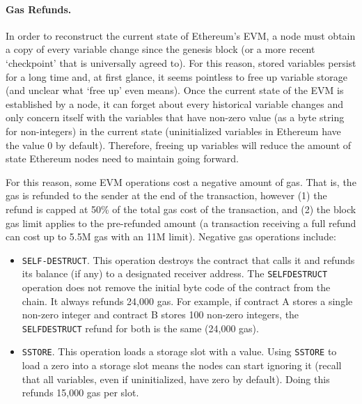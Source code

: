

\paragraph{Gas Refunds.} In order to reconstruct the current state of Ethereum's EVM, a node must obtain a copy of every variable change since the genesis block (or a more recent `checkpoint' that is universally agreed to). For this reason, stored variables persist for a long time and, at first glance, it seems pointless to free up variable storage (and unclear what `free up' even means). Once the current state of the EVM is established by a node, it can forget about every historical variable changes and only concern itself with the variables that have non-zero value (as a byte string for non-integers) in the current state (uninitialized variables in Ethereum have the value 0 by default). Therefore, freeing up variables will reduce the amount of state Ethereum nodes need to maintain going forward.

For this reason, some EVM operations cost a negative amount of gas. That is, the gas is refunded to the sender at the end of the transaction, however (1) the refund is capped at 50\% of the total gas cost of the transaction, and (2) the block gas limit applies to the pre-refunded amount (\ie a transaction receiving a full refund can cost up to 5.5M gas with an 11M limit). Negative gas operations include:

\begin{itemize}

\item \texttt{SELF-DESTRUCT}. This operation destroys the contract that calls it and refunds its balance (if any) to a designated receiver address. The  \texttt{SELFDESTRUCT} operation does not remove the initial byte code of the contract from the chain. It always refunds 24,000 gas. For example, if contract A stores a single non-zero integer and contract B stores 100 non-zero integers, the \texttt{SELFDESTRUCT} refund for both is the same (24,000 gas).


\item \texttt{SSTORE}. This operation loads a storage slot with a value. Using \texttt{SSTORE} to load a zero into a storage slot means the nodes can start ignoring it (recall that all variables, even if uninitialized, have zero by default). Doing this refunds 15,000 gas per slot. 

\end{itemize} 

